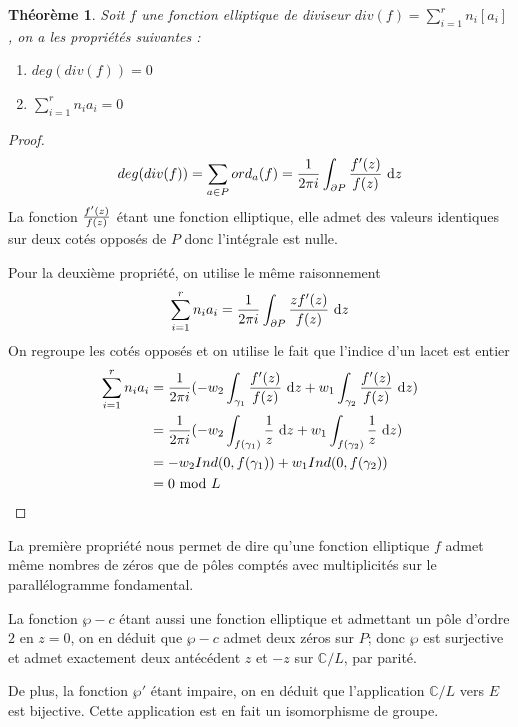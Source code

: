 \documentclass{article}
\newtheorem{theoreme}{Théorème}
\begin{document}
\begin{theoreme}
Soit $f$ une fonction elliptique de diviseur $div(f) = \sum_{i=1}^{r}{n_{i}[a_{i}]}$,
on a les propriétés suivantes :
\begin{enumerate}
\item $deg(div(f)) = 0$
\item $\sum_{i=1}^{r}{n_{i}a_{i}} = 0$
\end{enumerate}
\end{theoreme}

\begin{proof}
\begin{equation*}
deg(div(f)) = \sum_{a\in P}{ord_{a}(f)} = {1\over 2\pi i} \int_{\partial P} {f'(z)\over f(z)}~\mathrm dz
\end{equation*}
La fonction ${f'(z)\over f(z)}$ étant une fonction elliptique, elle admet des valeurs identiques sur deux cotés
opposés de $P$ donc l'intégrale est nulle.

Pour la deuxième propriété, on utilise le même raisonnement
\begin{equation*}
\sum_{i=1}^{r}{n_{i}a_{i}} = {1\over 2\pi i} \int_{\partial P} {zf'(z)\over f(z)}~\mathrm dz
\end{equation*}
On regroupe les cotés opposés et on utilise le fait que l'indice d'un lacet est entier
\begin{align*}
\sum_{i=1}^{r}{n_{i}a_{i}} &= {1\over 2\pi i}(-w_{2}\int_{\gamma_{1}} {f'(z)\over f(z)}~\mathrm dz
+ w_{1}\int_{\gamma_{2}} {f'(z)\over f(z)}~\mathrm dz) \\
							&= {1\over 2\pi i}(-w_{2}\int_{f(\gamma_{1})} {1\over z}~\mathrm dz + 
w_{1}\int_{f(\gamma_{2})} {1\over z}~\mathrm dz) \\
							&= -w_{2}Ind(0, f(\gamma_{1})) + w_{1}Ind(0, f(\gamma_{2})) \\
							& = 0\text{ mod }L
\end{align*}
\end{proof}

La première propriété nous permet de dire qu'une fonction elliptique $f$ admet même nombres de zéros que de 
pôles comptés avec multiplicités sur le parallélogramme fondamental.

La fonction $\wp - c$ étant aussi une fonction elliptique et admettant un pôle d'ordre $2$ en $z=0$, on en
déduit que $\wp - c$ admet deux zéros sur $P$; donc $\wp$ est surjective et admet exactement deux antécédent $z$ et 
$-z$ sur $\mathbb{C}/L$, par parité.

De plus, la fonction $\wp'$ étant impaire, on en déduit que l'application $\mathbb{C}/L$ vers $E$ est bijective.
Cette application est en fait un isomorphisme de groupe.
\end{document}
